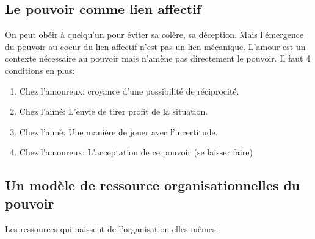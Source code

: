 \documentclass[11pt]{article} %
\begin{document}
\subsection{Le pouvoir comme lien affectif}

On peut obéir à quelqu'un pour éviter sa colère, sa déception. Mais
l'émergence du pouvoir au coeur du lien affectif n'est pas un lien
mécanique. L'amour est un contexte nécessaire au pouvoir mais n'amène
pas directement le pouvoir. Il faut 4 conditions en plus:

\begin{enumerate}
	\item Chez l'amoureux: croyance d'une possibilité de  réciprocité.
	\item Chez l'aimé: L'envie de tirer profit de la situation.
	\item Chez l'aimé: Une manière de jouer avec l'incertitude.
	\item Chez l'amoureux: L'acceptation de ce pouvoir (se laisser faire)
\end{enumerate}

\subsection{Un modèle de ressource organisationnelles du pouvoir}

Les ressources qui naissent de l'organisation elles-mêmes.
\end{document}
